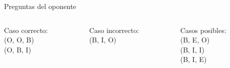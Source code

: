 \documentclass{beamer}
\begin{document}
\begin{frame}[t]{Preguntas del oponente}
    \begin{columns}[T]
        \begin{column}{0.3\textwidth}
            \pause
            Caso correcto:\\
            (O, O, B)\\
            \pause
            (O, B, I)\\
            \pause
        \end{column}
        \begin{column}{0.3\textwidth}
            Caso incorrecto:\\
            \pause
            (B, I, O)\\ 
            \pause
        \end{column}
        \begin{column}{0.3\textwidth}
            Casos posibles:\\
            \pause
            (B, E, O)\\
            (B, I, I)\\
            (B, I, E)\\
        \end{column}
    \end{columns}





\end{frame}
\end{document}

